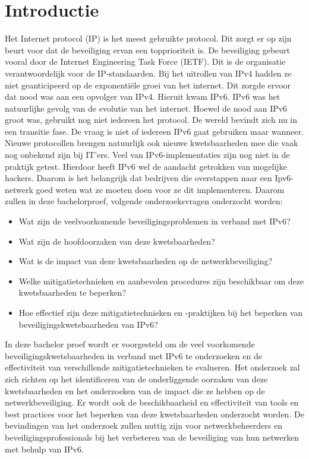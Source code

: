 
\section{Introductie}%
\label{sec:introductie}

Het Internet protocol (IP) is het meest gebruikte protocol. Dit zorgt er op zijn beurt voor dat de beveiliging ervan een topprioriteit is. De beveiliging gebeurt vooral door de Internet Engineering Task Force (IETF). Dit is de organisatie verantwoordelijk voor de IP-standaarden. Bij het uitrollen van IPv4 hadden ze niet geanticipeerd op de exponentiële groei van het internet. Dit zorgde ervoor dat nood was aan een opvolger van IPv4. Hieruit kwam IPv6. IPv6 was het natuurlijke gevolg van de evolutie van het internet. Hoewel de nood aan IPv6 groot was, gebruikt nog niet iedereen het protocol. De wereld bevindt zich nu in een transitie fase. De vraag is niet of iedereen IPv6 gaat gebruiken maar wanneer. Nieuwe protocollen brengen natuurlijk ook nieuwe kwetsbaarheden mee die vaak nog onbekend zijn bij IT’ers. Veel van IPv6-implementaties zijn nog niet in de praktijk getest.  Hierdoor heeft IPv6 wel de aandacht getrokken van mogelijke hackers. Daarom is het belangrijk dat bedrijven die overstappen naar een Ipv6-netwerk goed weten wat ze moeten doen voor ze dit implementeren. Daarom zullen in deze bachelorproef, volgende onderzoeksvragen onderzocht worden:
\begin{itemize}
  \item Wat zijn de veelvoorkomende beveiligingsproblemen in verband met IPv6?
	\item Wat zijn de hoofdoorzaken van deze kwetsbaarheden? 
 \item 	Wat is de impact van deze kwetsbaarheden op de netwerkbeveiliging?
\item	Welke mitigatietechnieken en aanbevolen procedures zijn beschikbaar om deze kwetsbaarheden te beperken?
 \item	Hoe effectief zijn deze mitigatietechnieken en -praktijken bij het beperken van {beveiligingskwetsbaarheden} van IPv6?
\end{itemize}

In deze bachelor proef wordt er voorgesteld om de veel voorkomende beveiligingskwetsbaarheden in verband met IPv6 te onderzoeken en de effectiviteit van verschillende mitigatietechnieken te evalueren. Het onderzoek zal zich richten op het identificeren van de onderliggende oorzaken van deze kwetsbaarheden en het onderzoeken van de impact die ze hebben op de netwerkbeveiliging. Er wordt ook de beschikbaarheid en effectiviteit van tools en best practices voor het beperken van deze kwetsbaarheden onderzocht worden. De bevindingen van het onderzoek zullen nuttig zijn voor netwerkbeheerders en beveiligingsprofessionals bij het verbeteren van de beveiliging van hun netwerken met behulp van IPv6.

